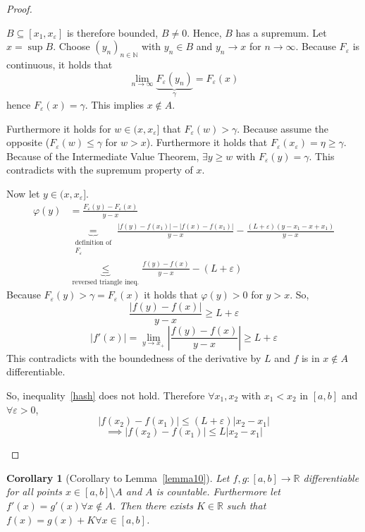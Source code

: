 \documentclass{article}
\newtheorem*{corollary}{Corollary}%
\newcommand{\card}[1]{\left|#1\right|}
\begin{document}
\begin{proof}
\begin{enumerate}
      $B \subseteq [x_1, x_{\varepsilon}]$ is therefore bounded, $B \neq 0$.
      Hence, $B$ has a supremum. Let $x = \sup{B}$.
      Choose $(y_n)_{n \in \mathbb N}$ with $y_n \in B$ and $y_n \to x$ for $n \to \infty$.
      Because $F_{\varepsilon}$ is continuous, it holds that
      \[ \lim_{n\to\infty} \underbrace{F_{\varepsilon}(y_n)}_{\gamma} = F_{\varepsilon}(x) \]
      hence $F_{\varepsilon}(x) = \gamma$. This implies $x \not\in A$.

      Furthermore it holds for $w \in (x, x_\varepsilon]$ that $F_{\varepsilon}(w) > \gamma$.
      Because assume the opposite ($F_{\varepsilon}(w) \leq \gamma$ for $w > x$).
      Furthermore it holds that $F_{\varepsilon}(x_{\varepsilon}) = \eta \geq \gamma$.
      Because of the Intermediate Value Theorem, $\exists y \geq w$ with $F_{\varepsilon}(y) = \gamma$.
      This contradicts with the supremum property of $x$.

      Now let $y \in (x, x_{\varepsilon}]$.
      \begin{align*}
        \varphi(y) &= \frac{F_{\varepsilon}(y) - F_{\varepsilon}(x)}{y - x} \\
          &\underbrace{=}_{\substack{\text{definition of} \\ F_{\varepsilon}}}
          \frac{\card{f(y) - f(x_1)} - \card{f(x) - f(x_1)}}{y - x} - \frac{(L + \varepsilon)(y - x_1 - x + x_1)}{y - x} \\
          &\underbrace{\leq}_{\text{reversed triangle ineq.}} \frac{f(y) - f(x)}{y - x} - (L + \varepsilon)
      \end{align*}
      Because $F_{\varepsilon}(y) > \gamma = F_{\varepsilon}(x)$ it holds that $\varphi(y) > 0$ for $y > x$.
      So,
      \[ \frac{\card{f(y) - f(x)}}{y - x} \geq L + \varepsilon \]
      \[ \card{f'(x)} = \lim_{y \to x_+} \card{\frac{f(y) - f(x)}{y - x}} \geq L + \varepsilon \]
      This contradicts with the boundedness of the derivative by $L$ and $f$ is in $x \not\in A$ differentiable.

      So, inequality~\eqref{hash} does not hold. Therefore $\forall x_1, x_2$ with $x_1 < x_2$ in $[a,b]$ and $\forall \varepsilon > 0$,
      \[ \card{f(x_2) - f(x_1)} \leq (L + \varepsilon)\card{x_2 - x_1} \]
      \[ \implies \card{f(x_2) - f(x_1)} \leq L \card{x_2 - x_1} \]
  \end{enumerate}
\end{proof}

\begin{corollary}[Corollary to Lemma~\ref{lemma10}]
  Let $f, g: [a,b] \to \mathbb R$ differentiable for all points $x \in [a,b] \setminus A$
  and $A$ is countable. Furthermore let $f'(x) = g'(x) \forall x \not\in A$.
  Then there exists $K \in \mathbb R$ such that $f(x) = g(x) + K \forall x \in [a,b]$.
\end{corollary}
\end{document}

